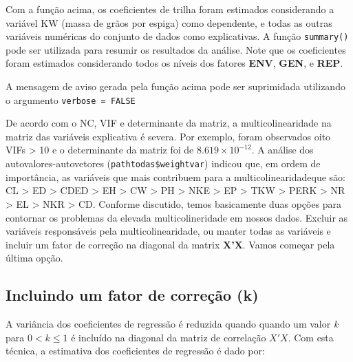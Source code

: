 \documentclass[
]{book}
\newenvironment{Shaded}{\begin{snugshade}}{\end{snugshade}}
\newcommand{\DataTypeTok}[1]{\textcolor[rgb]{0.13,0.29,0.53}{#1}}
\newcommand{\KeywordTok}[1]{\textcolor[rgb]{0.13,0.29,0.53}{\textbf{#1}}}
\newcommand{\NormalTok}[1]{#1}
\newcommand{\OperatorTok}[1]{\textcolor[rgb]{0.81,0.36,0.00}{\textbf{#1}}}
\newcommand{\OtherTok}[1]{\textcolor[rgb]{0.56,0.35,0.01}{#1}}
\newcommand{\StringTok}[1]{\textcolor[rgb]{0.31,0.60,0.02}{#1}}
\begin{document}
\begin{Shaded}
\end{Shaded}

Com a função acima, os coeficientes de trilha foram estimados considerando a variável KW (massa de grãos por espiga) como dependente, e todas as outras variáveis numéricas do conjunto de dados como explicativas. A função \texttt{summary()} pode ser utilizada para resumir os resultados da análise. Note que os coeficientes foram estimados considerando todos os níveis dos fatores \textbf{ENV}, \textbf{GEN}, e \textbf{REP}.

\begin{dica}
A mensagem de aviso gerada pela função acima pode ser suprimidada utilizando o argumento \texttt{verbose\ =\ FALSE}
\end{dica}

De acordo com o NC, VIF e determinante da matriz, a multicolinearidade  na matriz das variáveis explicativa é severa. Por exemplo, foram observados oito VIFs \textgreater{} 10 e o determinante da matriz foi de \(8.619 \times 10^{-12}\). A análise dos autovalores-autovetores (\texttt{pathtodas\$weightvar}) indicou que, em ordem de importância, as variáveis que mais contribuem para a multicolinearidadeque são: CL \textgreater{} ED \textgreater{} CDED \textgreater{} EH \textgreater{} CW \textgreater{} PH \textgreater{} NKE \textgreater{} EP \textgreater{} TKW \textgreater{} PERK \textgreater{} NR \textgreater{} EL \textgreater{} NKR \textgreater{} CD. Conforme discutido, temos basicamente duas opções para contornar os problemas da elevada multicolineridade em nossos dados. Excluir as variáveis responsáveis pela multicolinearidade, ou manter todas as variáveis e incluir um fator de correção na diagonal da matrix \textbf{X'X}. Vamos começar pela última opção.

\hypertarget{incluindo-um-fator-de-correuxe7uxe3o-k}{%
\subsection{Incluindo um fator de correção (k)}\label{incluindo-um-fator-de-correuxe7uxe3o-k}}

A variância dos coeficientes de regressão é reduzida quando quando um valor \emph{k} para \(0 < k \leq 1\) é incluído na diagonal da matriz de correlação \(X'X\). Com esta técnica, a estimativa dos coeficientes de regressão é dado por:
\end{document}
